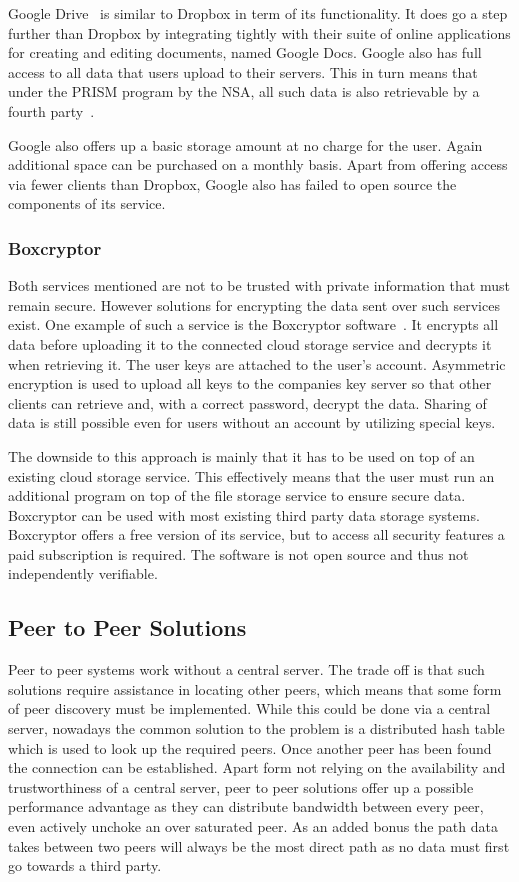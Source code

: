 Google Drive~\cite{web:site:gdrive} is similar to Dropbox in term of its functionality.
It does go a step further than Dropbox by integrating tightly with their suite of online applications for creating and editing documents, named Google Docs.
Google also has full access to all data that users upload to their servers.
This in turn means that under the PRISM program by the NSA, all such data is also retrievable by a fourth party~\cite{web:site:rt:google}.

Google also offers up a basic storage amount at no charge for the user.
Again additional space can be purchased on a monthly basis.
Apart from offering access via fewer clients than Dropbox, Google also has failed to open source the components of its service.

\subsubsection{Boxcryptor}

Both services mentioned are not to be trusted with private information that must remain secure.
However solutions for encrypting the data sent over such services exist.
One example of such a service is the Boxcryptor software~\cite{web:site:boxcryptor}.
It encrypts all data before uploading it to the connected cloud storage service and decrypts it when retrieving it.
The user keys are attached to the user's account.
Asymmetric encryption is used to upload all keys to the companies key server so that other clients can retrieve and, with a correct password, decrypt the data.
Sharing of data is still possible even for users without an account by utilizing special keys.

The downside to this approach is mainly that it has to be used on top of an existing cloud storage service.
This effectively means that the user must run an additional program on top of the file storage service to ensure secure data.
Boxcryptor can be used with most existing third party data storage systems.
Boxcryptor offers a free version of its service, but to access all security features a paid subscription is required.
The software is not open source and thus not independently verifiable.

\subsection{Peer to Peer Solutions}

Peer to peer systems work without a central server.
The trade off is that such solutions require assistance in locating other peers, which means that some form of peer discovery must be implemented.
While this could be done via a central server, nowadays the common solution to the problem is a distributed hash table which is used to look up the required peers.
Once another peer has been found the connection can be established.
Apart form not relying on the availability and trustworthiness of a central server, peer to peer solutions offer up a possible performance advantage as they can distribute bandwidth between every peer, even actively unchoke an over saturated peer.
As an added bonus the path data takes between two peers will always be the most direct path as no data must first go towards a third party.


